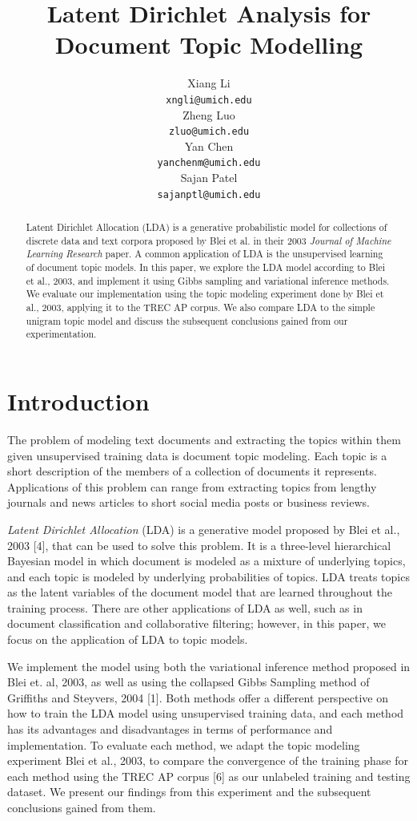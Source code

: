 \documentclass{article} %
\title{Latent Dirichlet Analysis for Document Topic Modelling}
\author{
Xiang Li\\
\texttt{xngli@umich.edu} \\
\And
Zheng Luo \\
\texttt{zluo@umich.edu} \\
\AND
Yan Chen\\
\texttt{yanchenm@umich.edu} \\
\And
Sajan Patel\\
\texttt{sajanptl@umich.edu} \\
}
\begin{document}
\maketitle

\begin{abstract}
Latent Dirichlet Allocation (LDA) is a generative probabilistic model for collections of discrete data and text
corpora proposed by Blei et al. in their 2003 \textit{Journal\- of Machine Learning Research} paper.
A common application of LDA is the unsupervised learning of document topic models.
In this paper, we explore the LDA model according
to Blei et al., 2003, and implement it using Gibbs sampling and variational inference methods. We evaluate our
implementation using the topic modeling experiment done by Blei et al., 2003, applying it to the TREC AP corpus.
We also compare LDA to the simple unigram topic model and discuss the subsequent conclusions gained
from our experimentation.
\end{abstract}

\section{Introduction}
The problem of modeling text documents and extracting the topics within them given unsupervised training data is
document topic modeling. Each topic is a short description of the members of a collection of documents it
represents. Applications of this problem can range from extracting topics from lengthy journals and
news articles to short social media posts or business reviews.

\textit{Latent Dirichlet Allocation} (LDA) is a generative model proposed by Blei et al., 2003 [4], that can be used to
solve this problem. It is a three-level hierarchical Bayesian model in which document is modeled as a mixture of
underlying topics, and each topic is modeled by underlying probabilities of topics. LDA treats topics as the latent
variables of the document model that are learned throughout the training process. There are other applications of
LDA as well, such as in document classification and collaborative filtering; however, in this paper, we focus on the
 application of LDA to topic models.

We implement the model using both the variational inference method proposed in Blei et. al, 2003, as well as using the collapsed
Gibbs Sampling method of Griffiths and Steyvers, 2004 [1]. Both methods offer a different perspective on how to train the
LDA model using unsupervised training data, and each method has its advantages and disadvantages in terms of
performance and implementation. To evaluate each method, we adapt the topic modeling experiment Blei et al., 2003,
to compare the convergence of the training phase for each method using the TREC AP corpus [6] as our unlabeled
training and testing dataset. We present our findings from this experiment and the subsequent conclusions gained from them.
\end{document}
